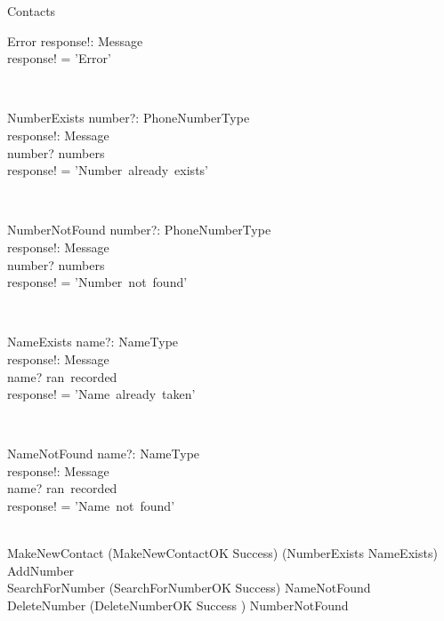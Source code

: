 \begin{class}{Contacts}
\begin{op}{Error}
response!: Message\\
\ST
response! =  'Error'\\
\end{op}\\
\zbreak
\begin{op}{NumberExists}
number?: PhoneNumberType \\
response!: Message \\
\ST
number? \in numbers \\
response! = 'Number~already~exists'
\end{op}\\
\begin{op}{NumberNotFound}
number?: PhoneNumberType \\
response!: Message \\
\ST
number? \notin numbers \\
response! = 'Number~not~found'
\end{op}\\
\begin{op}{NameExists}
name?: NameType \\
response!: Message \\
\ST
name? \in ran~recorded \\
response! = 'Name~already~taken'
\end{op}\\
\begin{op}{NameNotFound}
    name?: NameType \\
    response!: Message \\
    \ST
    name? \notin ran~recorded \\
    response! = 'Name~not~found'
\end{op}\\
\also
MakeNewContact \sdef (MakeNewContactOK \wedge Success) \oplus (NumberExists \lor NameExists) \\
AddNumber \sdef \\
SearchForNumber \sdef (SearchForNumberOK \wedge Success) \oplus NameNotFound \\
DeleteNumber \sdef (DeleteNumberOK \wedge Success ) \oplus NumberNotFound  \\
\end{class}